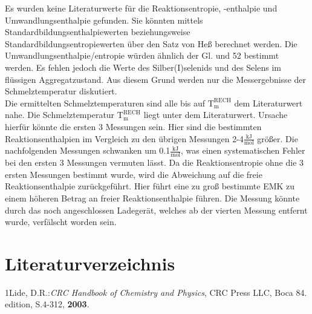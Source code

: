 \documentclass[12pt,a4paper,titlepage,headinclude,bibtotoc]{scrartcl}
\begin{document}
Es wurden keine Literaturwerte für die Reaktionsentropie, -enthalpie und Umwandlungsenthalpie gefunden. Sie könnten mittels Standardbildungsenthalpiewerten beziehungsweise Standardbildungsentropiewerten über den Satz von Heß berechnet werden. Die Umwandlungsenthalpie/entropie würden ähnlich der Gl. und 52 bestimmt werden. Es fehlen jedoch die Werte des Silber(I)selenids und des Selens im flüssigen Aggregatzustand. Aus diesem Grund werden nur die Messergebnisse der Schmelztemperatur diskutiert.\\
Die ermittelten Schmelztemperaturen sind alle bis auf $\text{T}_{\text{m}}^{\text{RECH}}$ dem Literaturwert nahe. Die Schmelztemperatur $\text{T}_{\text{m}}^{\text{RECH}}$ liegt unter dem Literaturwert. Ursache hierfür könnte die ersten 3 Messungen sein. Hier sind die bestimmten Reaktionsenthalpien im Vergleich zu den übrigen Messungen 2-4\;$\frac{\text{kJ}}{\text{mol}}$ größer. Die nachfolgenden Messungen schwanken um 0.1\;$\frac{\text{kJ}}{\text{mol}}$, was einen systematischen Fehler bei den ersten 3 Messungen vermuten lässt. Da die Reaktionsentropie ohne die 3 ersten Messungen bestimmt wurde, wird die Abweichung auf die freie Reaktionsenthalpie zurückgeführt. Hier führt eine zu groß bestimmte EMK zu einem höheren Betrag an freier Reaktionsenthalpie führen. Die Messung könnte durch das noch angeschlossen Ladegerät, welches ab der vierten Messung entfernt wurde, verfälscht worden sein.
\newpage
\section{Literaturverzeichnis}
1\quad Lide, D.R.:\textit{CRC Handbook of Chemistry and Physics}, CRC Press LLC, Boca 84. edition, S.4-312, \textbf{2003}.

\vspace{0,5 cm}
\end{document}
